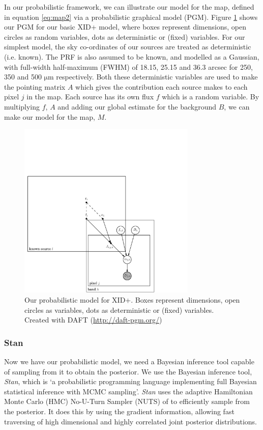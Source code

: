 \documentclass[useAMS,usenatbib]{mnras}
\begin{document}
In our probabilistic framework, we can illustrate our model for the map, defined in equation \ref{eq:map2} via a probabilistic graphical model (PGM). Figure \ref{fig:graph_mod_xid+} shows our PGM for our basic XID+ model, where boxes represent dimensions, open circles as random variables, dots as deterministic or (fixed) variables. For our simplest model, the sky co-ordinates of our sources are treated as deterministic (i.e. known). The PRF is also assumed to be known, and modelled as a Gaussian, with full-width half-maximum (FWHM) of 18.15, 25.15 and 36.3 arcsec for 250, 350 and 500 $\mathrm{\mu m}$ respectively. Both these deterministic variables are used to make the pointing matrix $A$ which gives the contribution each source makes to each pixel $j$ in the map. Each source has its own flux $f$ which is a random variable. By multiplying $f$, $A$ and adding our global estimate for the background $B$, we can make our model for the map, $M$. 
\begin{figure}
\includegraphics[width=8.5cm]{./graphical_model.pdf}
\caption{Our probabilistic model for XID+. Boxes represent dimensions, open circles as variables, dots as deterministic or (fixed) variables. Created with DAFT (\url{http://daft-pgm.org/})}\label{fig:graph_mod_xid+}
\end{figure}
 
\subsubsection{Stan}
Now we have our probabilistic model, we need a Bayesian inference tool capable of sampling from it to obtain the posterior. We use the Bayesian inference tool, \textit{Stan}, which is `a probabilistic programming language implementing full Bayesian statistical inference with MCMC sampling'. \textit{Stan} uses the adaptive Hamiltonian Monte Carlo (HMC) No-U-Turn Sampler (NUTS) of \cite{Hoffman:2013} to efficiently sample from the posterior. It does this by using the gradient information, allowing fast traversing of high dimensional and highly correlated joint posterior distributions. 
\end{document}
